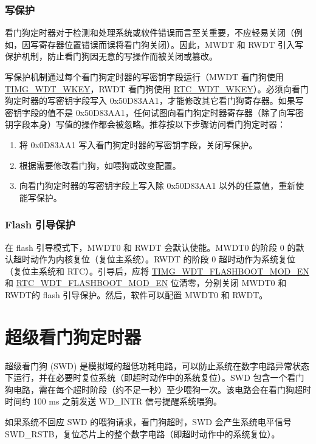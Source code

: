 \documentclass[main\_\_CN.tex]{subfiles}
\begin{document}
\subsubsection{写保护}
看门狗定时器对于检测和处理系统或软件错误而言至关重要，不应轻易关闭（例如，因写寄存器位置错误而误将看门狗关闭）。因此，MWDT 和 RWDT 引入写保护机制，防止看门狗因无意的写操作而被关闭或篡改。

写保护机制通过每个看门狗定时器的写密钥字段运行（MWDT 看门狗使用 \hyperref[fielddesc:TIMGWDTWKEY]{TIMG\_WDT\_WKEY}，RWDT 看门狗使用 \hyperref[fielddesc:RTCWDTWKEY]{RTC\_WDT\_WKEY}）。必须向看门狗定时器的写密钥字段写入 0x50D83AA1，才能修改其它看门狗寄存器。如果写密钥字段的值不是 0x50D83AA1，任何试图向看门狗定时器寄存器（除了向写密钥字段本身）写值的操作都会被忽略。推荐按以下步骤访问看门狗定时器：

\begin{enumerate}
\item 将 0x0D83AA1 写入看门狗定时器的写密钥字段，关闭写保护。
\item 根据需要修改看门狗，如喂狗或改变配置。
\item 向看门狗定时器的写密钥字段上写入除 0x50D83AA1 以外的任意值，重新使能写保护。
\end{enumerate}

\subsubsection{Flash 引导保护}
在 flash 引导模式下，MWDT0 和 RWDT 会默认使能。MWDT0 的阶段 0 的默认超时动作为内核复位（复位主系统）。RWDT 的阶段 0 超时动作为系统复位（复位主系统和 RTC）。引导后，应将 \hyperref[fielddesc:TIMGWDTFLASHBOOTMODEN]{TIMG\_WDT\_FLASHBOOT\_MOD\_EN} 和 \hyperref[fielddesc:RTCWDTFLASHBOOTMODEN]{RTC\_WDT\_FLASHBOOT\_MOD\_EN} 位清零，分别关闭 MWDT0 和 RWDT的 flash 引导保护。然后，软件可以配置 MWDT0 和 RWDT。


\section{超级看门狗定时器}\label{sec:wdt-swdt}
超级看门狗 (SWD) 是模拟域的超低功耗电路，可以防止系统在数字电路异常状态下运行，并在必要时复位系统（即超时动作中的系统复位）。SWD 包含一个看门狗电路，需在每个超时阶段（约不足一秒）至少喂狗一次。该电路会在看门狗超时时间约 100 ms 之前发送 WD\_INTR 信号提醒系统喂狗。

如果系统不回应 SWD 的喂狗请求，看门狗超时，SWD 会产生系统电平信号 SWD\_RSTB，复位芯片上的整个数字电路（即超时动作中的系统复位）。
\end{document}
